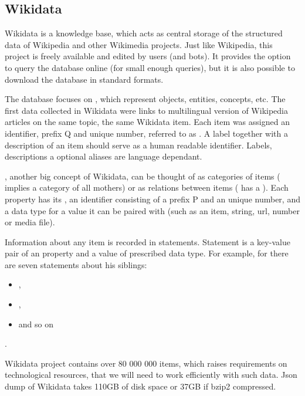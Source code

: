 \subsection{Wikidata}

Wikidata is a knowledge base, which acts as central storage of the structured data of Wikipedia and other Wikimedia projects. Just like Wikipedia, this project is freely available and edited by users (and bots). It provides the option to query the database online (for small enough queries), but it is also possible to download the database in standard formats.

The database focuses on , which represent objects, entities, concepts, etc.  The first data collected in Wikidata were links to multilingual version of Wikipedia articles on the same topic, the same Wikidata item. Each item was assigned an identifier, prefix Q and unique number, referred to as . A label together with a description of an item should serve as a human readable identifier. Labels, descriptions a optional aliases are language dependant. 

, another big concept of Wikidata, can be thought of as categories of items ( implies a category of all mothers) or as relations between items ( has a  ). Each property has its , an identifier consisting of a prefix P and an unique number, and a data type for a value it can be paired with (such as an item, string, url, number or media file). 

Information about any item is recorded in statements. Statement is a key-value pair of an property and a value of prescribed data type. For example, for  there are seven statements about his siblings:
\begin{itemize}
\item {} , 
\item {} ,
\item {}  and so on
\end{itemize} . 

Wikidata project contains over 80 000 000 items, which raises requirements on technological resources, that we will need to work efficiently with such data. Json dump of Wikidata takes 110GB of disk space or 37GB if bzip2 compressed.

